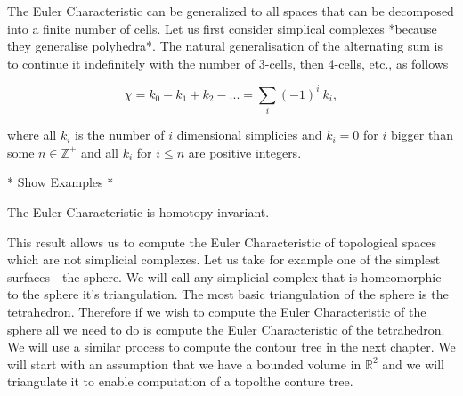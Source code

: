 The Euler Characteristic can be generalized to all spaces that can be decomposed into a finite number of cells. Let us first consider simplical complexes *because they generalise polyhedra*. The natural generalisation of the alternating sum is to continue it indefinitely with the number of 3-cells, then 4-cells, etc., as follows

$$ \chi = k_0 - k_1 + k_2 - ... = \sum_{i}{(-1)^i~k_i}, $$

where all $k_i$ is the number of $i$ dimensional simplicies and $k_i = 0$ for $i$ bigger than some $n \in \mathbb{Z}^+$ and all $k_i$ for $i \le n$ are positive integers.

* Show Examples *

\begin{lem}   The Euler Characteristic is homotopy invariant. \end{lem}

This result allows us to compute the Euler Characteristic of topological spaces which are not simplicial complexes. Let us take for example one of the simplest surfaces - the sphere. We will call any simplicial complex that is homeomorphic to the sphere it's triangulation. The most basic triangulation of the sphere is the tetrahedron. Therefore if we wish to compute the Euler Characteristic of the sphere all we need to do is compute the Euler Characteristic of the tetrahedron. We will use a similar process to compute the contour tree in the next chapter. We will start with an assumption that we have a bounded volume in $\mathbb{R}^2$ and we will triangulate it to enable computation of a topolthe conture tree.

